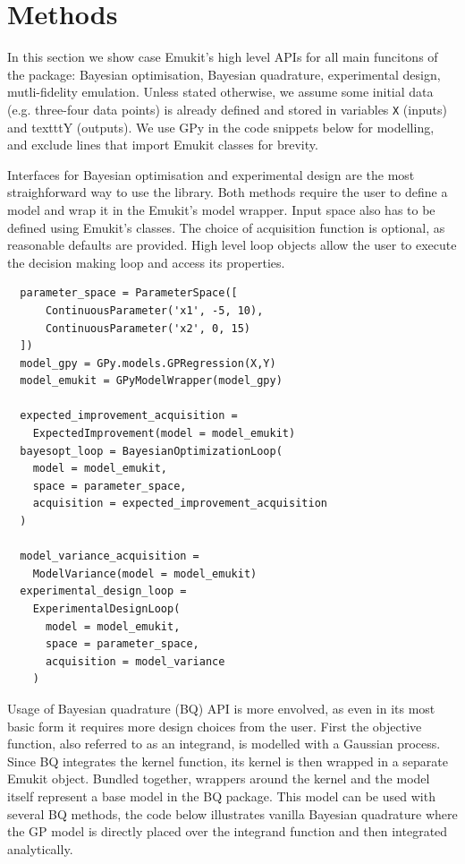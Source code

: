 \section{Methods}
In this section we show case Emukit's high level APIs for all main funcitons of the package: Bayesian optimisation, Bayesian quadrature, experimental design, mutli-fidelity emulation. Unless stated otherwise, we assume some initial data (e.g. three-four data points) is already defined and stored in variables \texttt{X} (inputs) and texttt{Y} (outputs). We use GPy \cite{gpy2014} in the code snippets below for modelling, and exclude lines that import Emukit classes for brevity.

Interfaces for Bayesian optimisation and experimental design are the most straighforward way to use the library. Both methods require the user to define a model and wrap it in the Emukit's model wrapper. Input space also has to be defined using Emukit's classes. The choice of acquisition function is optional, as reasonable defaults are provided. High level loop objects allow the user to execute the decision making loop and access its properties.

\begin{verbatim}
  parameter_space = ParameterSpace([
      ContinuousParameter('x1', -5, 10),
      ContinuousParameter('x2', 0, 15)
  ])
  model_gpy = GPy.models.GPRegression(X,Y)
  model_emukit = GPyModelWrapper(model_gpy)

  expected_improvement_acquisition =
    ExpectedImprovement(model = model_emukit)
  bayesopt_loop = BayesianOptimizationLoop(
    model = model_emukit,
    space = parameter_space,
    acquisition = expected_improvement_acquisition
  )

  model_variance_acquisition =
    ModelVariance(model = model_emukit)
  experimental_design_loop =
    ExperimentalDesignLoop(
      model = model_emukit,
      space = parameter_space,
      acquisition = model_variance
    )
\end{verbatim}

Usage of Bayesian quadrature (BQ) API is more envolved, as even in its most basic form it requires more design choices from the user. First the objective function, also referred to as an integrand, is modelled with a Gaussian process. Since BQ integrates the kernel function, its kernel is then wrapped in a separate Emukit object.  Bundled together, wrappers around the kernel and the model itself represent a base model in the BQ package. This model can be used with several BQ methods, the code below illustrates vanilla Bayesian quadrature where the GP model is directly placed over the integrand function and then integrated analytically.

